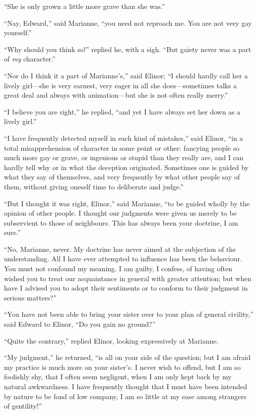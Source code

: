 \documentclass{article}
\begin{document}
``She is only grown a little more grave than she was.''

``Nay, Edward,'' said Marianne, ``you need not reproach me.
You are not very gay yourself.''

``Why should you think so!'' replied he, with a sigh.
``But gaiety never was a part of \emph{my} character.''

``Nor do I think it a part of Marianne's,'' said Elinor;
``I should hardly call her a lively girl---she is very earnest,
very eager in all she does---sometimes talks a great deal
and always with animation---but she is not often really merry.''

``I believe you are right,'' he replied, ``and yet I
have always set her down as a lively girl.''

``I have frequently detected myself in such kind of mistakes,''
said Elinor, ``in a total misapprehension of character in some
point or other: fancying people so much more gay or grave,
or ingenious or stupid than they really are, and I can
hardly tell why or in what the deception originated.
Sometimes one is guided by what they say of themselves,
and very frequently by what other people say of them,
without giving oneself time to deliberate and judge.''

``But I thought it was right, Elinor,'' said Marianne,
``to be guided wholly by the opinion of other people.
I thought our judgments were given us merely to be subservient
to those of neighbours.  This has always been your doctrine,
I am sure.''

``No, Marianne, never.  My doctrine has never aimed
at the subjection of the understanding.  All I have
ever attempted to influence has been the behaviour.
You must not confound my meaning.  I am guilty, I confess,
of having often wished you to treat our acquaintance
in general with greater attention; but when have I advised
you to adopt their sentiments or to conform to their
judgment in serious matters?''

``You have not been able to bring your sister over to your
plan of general civility,'' said Edward to Elinor, ``Do you gain
no ground?''

``Quite the contrary,'' replied Elinor,
looking expressively at Marianne.

``My judgment,'' he returned, ``is all on your side
of the question; but I am afraid my practice is much
more on your sister's.  I never wish to offend, but I
am so foolishly shy, that I often seem negligent,
when I am only kept back by my natural awkwardness.
I have frequently thought that I must have been intended
by nature to be fond of low company, I am so little at
my ease among strangers of gentility!''
\end{document}
